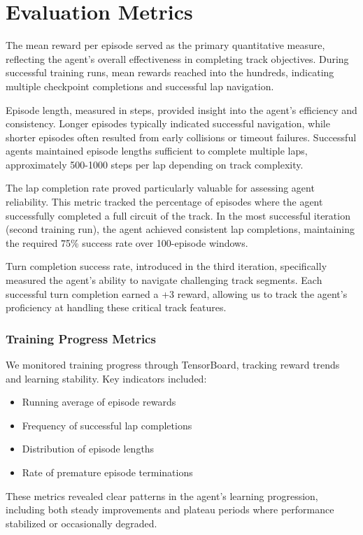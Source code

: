 \documentclass[10pt,twocolumn]{article}
\begin{document}
\section{Evaluation Metrics}
The mean reward per episode served as the primary quantitative measure, reflecting the agent's overall effectiveness in completing track objectives. During successful training runs, mean rewards reached into the hundreds, indicating multiple checkpoint completions and successful lap navigation.

Episode length, measured in steps, provided insight into the agent's efficiency and consistency. Longer episodes typically indicated successful navigation, while shorter episodes often resulted from early collisions or timeout failures. Successful agents maintained episode lengths sufficient to complete multiple laps, approximately 500-1000 steps per lap depending on track complexity.

The lap completion rate proved particularly valuable for assessing agent reliability. This metric tracked the percentage of episodes where the agent successfully completed a full circuit of the track. In the most successful iteration (second training run), the agent achieved consistent lap completions, maintaining the required 75\% success rate over 100-episode windows.

Turn completion success rate, introduced in the third iteration, specifically measured the agent's ability to navigate challenging track segments. Each successful turn completion earned a +3 reward, allowing us to track the agent's proficiency at handling these critical track features.

\subsubsection{Training Progress Metrics}
We monitored training progress through TensorBoard, tracking reward trends and learning stability. Key indicators included:
\begin{itemize}
    \item Running average of episode rewards
    \item Frequency of successful lap completions
    \item Distribution of episode lengths
    \item Rate of premature episode terminations
\end{itemize}
These metrics revealed clear patterns in the agent's learning progression, including both steady improvements and plateau periods where performance stabilized or occasionally degraded.
\end{document}
